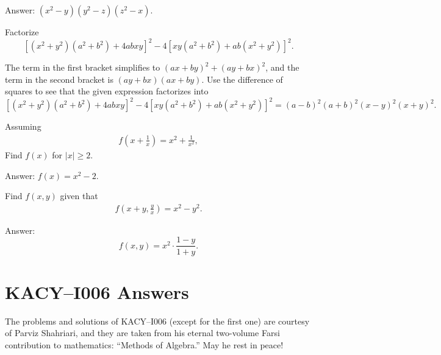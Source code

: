\documentclass[12pt,a4paper]{memoir}
\theoremstyle{definition}
\begin{document}
	\begin{solution}[name=Solution by Parviz Shahriari]
		Answer: $(x^2-y)(y^2-z)(z^2-x)$.
	\end{solution}
	
	
	\setcounter{question}{94}
	
	\begin{tcolorbox}
		\begin{question}
		Factorize \[[(x^2+y^2)(a^2+b^2)+4abxy]^2 - 4[xy(a^2+b^2)+ab(x^2+y^2)]^2.\]
	\end{question}
	\end{tcolorbox}
	
	\begin{solution}[name=Solution by Parviz Shahriari]
		The term in the first bracket simplifies to $(ax+by)^2+(ay+bx)^2$, and the term in the second bracket is $(ay+bx)(ax+by)$. Use the difference of squares to see that the given expression factorizes into $$[(x^2+y^2)(a^2+b^2)+4abxy]^2 - 4[xy(a^2+b^2)+ab(x^2+y^2)]^2=(a-b)^2(a+b)^2(x-y)^2(x+y)^2.$$ 
	\end{solution}
	
	
	\setcounter{question}{107}
	
	\begin{tcolorbox}
		\SetupExSheets{headings=runin}
		\begin{question}
			Assuming
			\begin{align*}
				f\left(x+\frac{1}{x}\right)= x^2 + \frac{1}{x^2},
			\end{align*}
			Find $f(x)$ for $|x| \geq 2$.
		\end{question}
	\end{tcolorbox}
	
	\begin{solution}[name=Solution by Parviz Shahriari]
		Answer: $f(x)=x^2-2$.
	\end{solution}
	
	
	
	\setcounter{question}{117}
	
	\begin{tcolorbox}
		\begin{question}
			Find $f(x,y)$ given that
			\begin{align*}
				f\left(x+y, \frac{y}{x}\right) = x^2 - y^2.
			\end{align*}
		\end{question}
	\end{tcolorbox}
	
	\begin{solution}[name=Solution by Parviz Shahriari]
		Answer: $$f(x,y)=x^2 \cdot \frac{1-y}{1+y}.$$
	\end{solution}
	

	\newpage
	\section*{KACY--I006 Answers}
	The problems and solutions of KACY--I006 (except for the first one) are courtesy of Parviz Shahriari, and they are taken from his eternal two-volume Farsi contribution to mathematics: ``Methods of Algebra.'' May he rest in peace!
	
	\vspace{1em}
	
	\printsolutions
\end{document}
